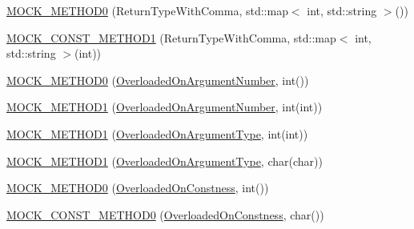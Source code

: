 \begin{DoxyCompactItemize}
\item 
\mbox{\hyperlink{classtesting_1_1gmock__generated__function__mockers__test_1_1_mock_foo_adda63f3a046fadc9ad44731240d441e2}{M\+O\+C\+K\+\_\+\+M\+E\+T\+H\+O\+D0}} (Return\+Type\+With\+Comma, std\+::map$<$ int, std\+::string $>$())
\item 
\mbox{\hyperlink{classtesting_1_1gmock__generated__function__mockers__test_1_1_mock_foo_a921e9d77c56ab58ef3881de92ffa3ae0}{M\+O\+C\+K\+\_\+\+C\+O\+N\+S\+T\+\_\+\+M\+E\+T\+H\+O\+D1}} (Return\+Type\+With\+Comma, std\+::map$<$ int, std\+::string $>$(int))
\item 
\mbox{\hyperlink{classtesting_1_1gmock__generated__function__mockers__test_1_1_mock_foo_a1666c565d1b48b351a1a453f6f87ff22}{M\+O\+C\+K\+\_\+\+M\+E\+T\+H\+O\+D0}} (\mbox{\hyperlink{classtesting_1_1gmock__generated__function__mockers__test_1_1_foo_interface_ae9e86ac64fa9acedfb1fa747174c7f43}{Overloaded\+On\+Argument\+Number}}, int())
\item 
\mbox{\hyperlink{classtesting_1_1gmock__generated__function__mockers__test_1_1_mock_foo_a45014dba5c27e9d59af3a94e0d324096}{M\+O\+C\+K\+\_\+\+M\+E\+T\+H\+O\+D1}} (\mbox{\hyperlink{classtesting_1_1gmock__generated__function__mockers__test_1_1_foo_interface_ae9e86ac64fa9acedfb1fa747174c7f43}{Overloaded\+On\+Argument\+Number}}, int(int))
\item 
\mbox{\hyperlink{classtesting_1_1gmock__generated__function__mockers__test_1_1_mock_foo_ad900c5945fc52a0a95ca1480207c7add}{M\+O\+C\+K\+\_\+\+M\+E\+T\+H\+O\+D1}} (\mbox{\hyperlink{classtesting_1_1gmock__generated__function__mockers__test_1_1_foo_interface_ad9cc9a11570403fb8378ed6620892ec6}{Overloaded\+On\+Argument\+Type}}, int(int))
\item 
\mbox{\hyperlink{classtesting_1_1gmock__generated__function__mockers__test_1_1_mock_foo_ab4b323a9c06a48c1116d55419195c1a6}{M\+O\+C\+K\+\_\+\+M\+E\+T\+H\+O\+D1}} (\mbox{\hyperlink{classtesting_1_1gmock__generated__function__mockers__test_1_1_foo_interface_ad9cc9a11570403fb8378ed6620892ec6}{Overloaded\+On\+Argument\+Type}}, char(char))
\item 
\mbox{\hyperlink{classtesting_1_1gmock__generated__function__mockers__test_1_1_mock_foo_a291ff46b043d00d0f0acb081c5c36f2e}{M\+O\+C\+K\+\_\+\+M\+E\+T\+H\+O\+D0}} (\mbox{\hyperlink{classtesting_1_1gmock__generated__function__mockers__test_1_1_foo_interface_afbbe6ec72ae237de05e109dea5b03f4f}{Overloaded\+On\+Constness}}, int())
\item 
\mbox{\hyperlink{classtesting_1_1gmock__generated__function__mockers__test_1_1_mock_foo_aa0da575ad3061850662c5f401ddb30c2}{M\+O\+C\+K\+\_\+\+C\+O\+N\+S\+T\+\_\+\+M\+E\+T\+H\+O\+D0}} (\mbox{\hyperlink{classtesting_1_1gmock__generated__function__mockers__test_1_1_foo_interface_afbbe6ec72ae237de05e109dea5b03f4f}{Overloaded\+On\+Constness}}, char())

\end{DoxyCompactItemize}
